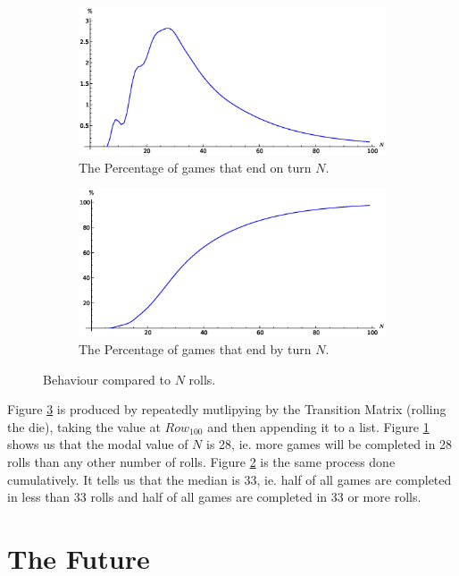 \documentclass[a4paper]{article}
\begin{document}
\begin{figure}[!htbp]
\centering
\begin{subfigure}{.5\textwidth}
  \includegraphics[width=\linewidth]{images/turns}
  \caption{The Percentage of games that end on turn $N$.}
  \label{rolls}
\end{subfigure}%
\begin{subfigure}{.5\textwidth}
  \centering
  \includegraphics[width=\linewidth]{images/sumturns}
  \caption{The Percentage of games that end by turn $N$.}
  \label{sumrolls}
\end{subfigure}
\caption{Behaviour compared to $N$ rolls.}
\label{Nrolls}
\end{figure}

Figure \ref{Nrolls} is produced by repeatedly mutlipying by the Transition Matrix (rolling the die), taking the value at $Row_{100}$ and then appending it to a list.  Figure \ref{rolls} shows us that the modal value of $N$ is 28, ie. more games will be completed in 28 rolls than any other number of rolls. Figure \ref{sumrolls} is the same process done cumulatively. It tells us that the median is 33, ie. half of all games are completed in less than 33 rolls and half of all games are completed in 33 or more rolls.

\section{The Future}
\end{document}
